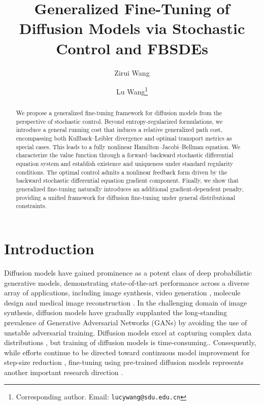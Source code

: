 \documentclass[11pt]{article}
\begin{document}
%
%
\title{Generalized Fine-Tuning of Diffusion Models via Stochastic Control and FBSDEs}
%
\author[1]{Zirui Wang}
\author[1]{Lu Wang\thanks{Corresponding author. Email: \texttt{lucywang@sdu.edu.cn}}} %


\maketitle  


\begin{abstract}
We propose a generalized fine-tuning framework for diffusion models from the perspective of stochastic control. Beyond entropy-regularized formulations, we introduce a general running cost that induces a relative generalized path cost, encompassing both Kullback–Leibler divergence and optimal transport metrics as special cases. This leads to a fully nonlinear Hamilton–Jacobi–Bellman equation. We characterize the value function through a forward–backward stochastic differential equation system and establish existence and uniqueness under standard regularity conditions. The optimal control admits a nonlinear feedback form driven by the backward stochastic differential equation gradient component. Finally, we show that generalized fine-tuning naturally introduces an additional gradient-dependent penalty, providing a unified framework for diffusion fine-tuning under general distributional constraints.
\end{abstract}


\section{Introduction}
Diffusion models \cite{sohl2015deep,song2020score,ho2020denoising} have gained prominence as a potent class of deep probabilistic generative models, demonstrating state-of-the-art performance across a diverse array of applications, including image synthesis, video generation \cite{ho2022imagen}, molecule design \cite{hoogeboom2022equivariant,xu2022geodiff} and medical image reconstruction \cite{chung2022score,xie2022measurement}. In the challenging domain of image synthesis, diffusion models have gradually supplanted the long-standing prevalence of Generative Adversarial Networks (GANs) \cite{goodfellow2014generative} by avoiding the use of unstable adversarial training. Diffusion models excel at capturing complex data distributions , but training of diffusion models is time-consuming.\cite{song2020denoising,kong2021fast}. Consequently, while efforts continue to be directed toward continuous model improvement for step-size reduction \cite{liu2023instaflow,yin2024one}, fine-tuning using pre-trained diffusion models represents another important research direction \cite{black2023training,fan2023dpok,ruiz2023dreambooth}. 
\end{document}
